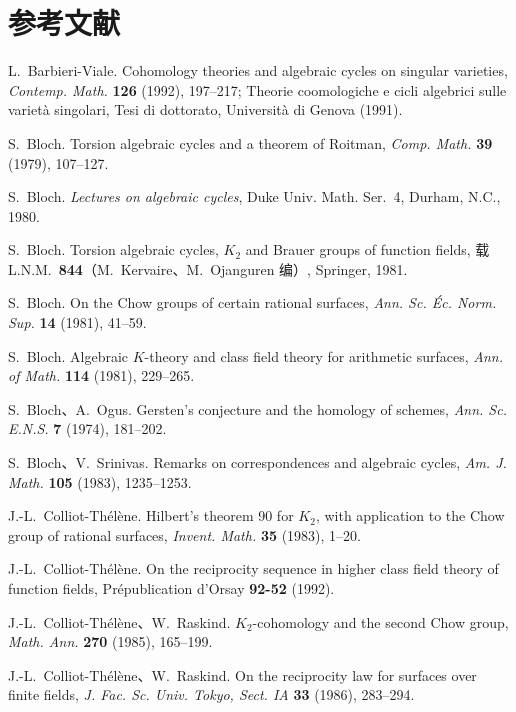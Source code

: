 \section*{参考文献}
\begin{description}[leftmargin=3.4em,labelsep=.5em,font=\normalfont]
\item[{[BV]}] L.~Barbieri-Viale. Cohomology theories and algebraic cycles on singular varieties, \textit{Contemp. Math.} \textbf{126} (1992), 197--217; Theorie coomologiche e cicli algebrici sulle varietà singolari, Tesi di dottorato, Università di Genova (1991).
\item[{[B1]}] S.~Bloch. Torsion algebraic cycles and a theorem of Roitman, \textit{Comp. Math.} \textbf{39} (1979), 107--127.
\item[{[B2]}] S.~Bloch. \textit{Lectures on algebraic cycles}, Duke Univ. Math. Ser.~4, Durham, N.C., 1980.
\item[{[B3]}] S.~Bloch. Torsion algebraic cycles, $K_2$ and Brauer groups of function fields, 载 L.N.M.~\textbf{844}（M.~Kervaire、M.~Ojanguren 编）, Springer, 1981.
\item[{[B4]}] S.~Bloch. On the Chow groups of certain rational surfaces, \textit{Ann. Sc. Éc. Norm. Sup.} \textbf{14} (1981), 41--59.
\item[{[B5]}] S.~Bloch. Algebraic $K$-theory and class field theory for arithmetic surfaces, \textit{Ann. of Math.} \textbf{114} (1981), 229--265.
\item[{[BO]}] S.~Bloch、A.~Ogus. Gersten's conjecture and the homology of schemes, \textit{Ann. Sc. E.N.S.} \textbf{7} (1974), 181--202.
\item[{[BS]}] S.~Bloch、V.~Srinivas. Remarks on correspondences and algebraic cycles, \textit{Am. J. Math.} \textbf{105} (1983), 1235--1253.
\item[{[C1]}] J.-L.~Colliot-Thélène. Hilbert's theorem 90 for $K_2$, with application to the Chow group of rational surfaces, \textit{Invent. Math.} \textbf{35} (1983), 1--20.
\item[{[C2]}] J.-L.~Colliot-Thélène. On the reciprocity sequence in higher class field theory of function fields, Prépublication d'Orsay \textbf{92-52} (1992).
\item[{[CR1]}] J.-L.~Colliot-Thélène、W.~Raskind. $K_2$-cohomology and the second Chow group, \textit{Math. Ann.} \textbf{270} (1985), 165--199.
\item[{[CR2]}] J.-L.~Colliot-Thélène、W.~Raskind. On the reciprocity law for surfaces over finite fields, \textit{J. Fac. Sc. Univ. Tokyo, Sect. IA} \textbf{33} (1986), 283--294.

\end{description}
